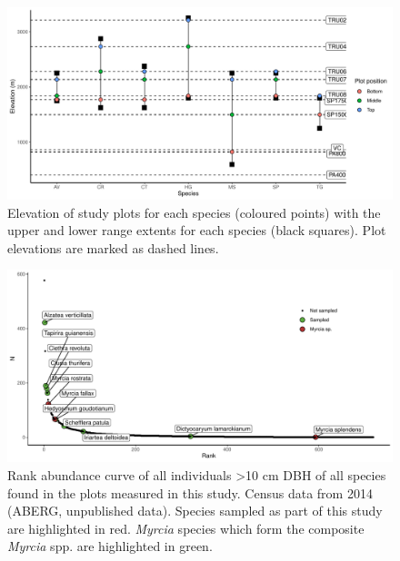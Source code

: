 \documentclass[a4paper, 11pt]{article}
\begin{document}

\begin{figure}[H]
\includegraphics[width=\textwidth]{ranges}
\centering
\caption{Elevation of study plots for each species (coloured points) with the upper and lower range extents for each species (black squares). Plot elevations are marked as dashed lines.}
\label{fig:ranges_ggplot}
\end{figure}



\begin{figure}[H]
\includegraphics[width=\textwidth]{rank_abund}
\centering
\caption{Rank abundance curve of all individuals \textgreater{}10 cm DBH of all species found in the plots measured in this study. Census data from 2014 (ABERG, unpublished data). Species sampled as part of this study are highlighted in red. \textit{Myrcia} species which form the composite \textit{Myrcia} spp. are highlighted in green.}
\label{fig:rank_abund}
\end{figure}
\end{document}
